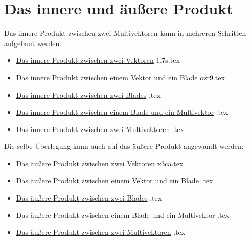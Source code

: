 \documentclass{sajzk}
\begin{document}
\section{Das innere und äußere Produkt}
\label{bzmt}
Das innere Produkt zwischen zwei Multivektoren kann in mehreren Schritten
aufgebaut werden.
\begin{itemize}
    \item \href{1l7s.pdf}{Das innere Produkt zwischen zwei Vektoren} 1l7s.tex
    \item \href{ozr9.pdf}{Das innere Produkt zwischen einem Vektor und ein Blade} ozr9.tex
    \item \href{.pdf}{Das innere Produkt zwischen zwei Blades} .tex
    \item \href{.pdf}{Das innere Produkt zwischen einem Blade und ein Multivektor} .tex
    \item \href{.pdf}{Das innere Produkt zwischen zwei Multivektoren} .tex
\end{itemize}

Die selbe Überlegung kann auch auf das äußere Produkt angewandt werden:
\begin{itemize}
    \item \href{x3ca.pdf}{Das äußere Produkt zwischen zwei Vektoren} x3ca.tex
    \item \href{.pdf}{Das äußere Produkt zwischen einem Vektor und ein Blade} .tex
    \item \href{.pdf}{Das äußere Produkt zwischen zwei Blades} .tex
    \item \href{.pdf}{Das äußere Produkt zwischen einem Blade und ein Multivektor} .tex
    \item \href{.pdf}{Das äußere Produkt zwischen zwei Multivektoren} .tex
\end{itemize}
\end{document}
